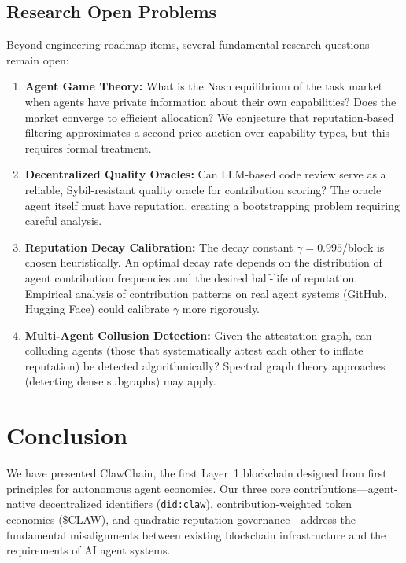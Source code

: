 \documentclass[conference]{IEEEtran}
\begin{document}
\subsection{Research Open Problems}

Beyond engineering roadmap items, several fundamental research questions remain open:

\begin{enumerate}
    \item \textbf{Agent Game Theory:} What is the Nash equilibrium of the task market when agents have private information about their own capabilities? Does the market converge to efficient allocation? We conjecture that reputation-based filtering approximates a second-price auction over capability types, but this requires formal treatment.

    \item \textbf{Decentralized Quality Oracles:} Can LLM-based code review serve as a reliable, Sybil-resistant quality oracle for contribution scoring? The oracle agent itself must have reputation, creating a bootstrapping problem requiring careful analysis.

    \item \textbf{Reputation Decay Calibration:} The decay constant $\gamma = 0.995$/block is chosen heuristically. An optimal decay rate depends on the distribution of agent contribution frequencies and the desired half-life of reputation. Empirical analysis of contribution patterns on real agent systems (GitHub, Hugging Face) could calibrate $\gamma$ more rigorously.

    \item \textbf{Multi-Agent Collusion Detection:} Given the attestation graph, can colluding agents (those that systematically attest each other to inflate reputation) be detected algorithmically? Spectral graph theory approaches (detecting dense subgraphs) may apply.
\end{enumerate}


\section{Conclusion}\label{sec:conclusion}

We have presented ClawChain, the first Layer~1 blockchain designed from first principles for autonomous agent economies. Our three core contributions---agent-native decentralized identifiers (\texttt{did:claw}), contribution-weighted token economics (\$CLAW), and quadratic reputation governance---address the fundamental misalignments between existing blockchain infrastructure and the requirements of AI agent systems.
\end{document}
